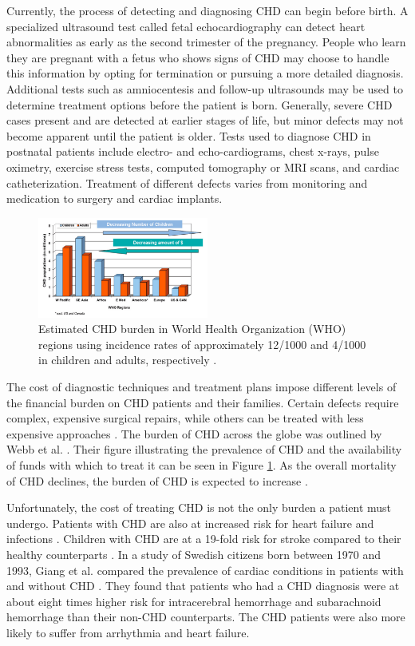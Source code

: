 Currently, the process of detecting and diagnosing CHD can begin before birth. A specialized ultrasound test called fetal echocardiography can detect heart abnormalities as early as the second trimester of the pregnancy. People who learn they are pregnant with a fetus who shows signs of CHD may choose to handle this information by opting for termination or pursuing a more detailed diagnosis. Additional tests such as amniocentesis and follow-up ultrasounds may be used to determine treatment options before the patient is born. Generally, severe CHD cases present and are detected at earlier stages of life, but minor defects may not become apparent until the patient is older. Tests used to diagnose CHD in postnatal patients include electro- and echo-cardiograms, chest x-rays, pulse oximetry, exercise stress tests, computed tomography or MRI scans, and cardiac catheterization. Treatment of different defects varies from monitoring and medication to surgery and cardiac implants.

\begin{figure}
\centering
\includegraphics[width=0.5\textwidth]{5/CHD-burden-webb.png}
\caption{Estimated CHD burden in World Health Organization (WHO) regions using incidence rates of approximately 12/1000 and 4/1000 in children and adults, respectively \cite{Webb2015}.}
\label{ch5:fig:CHD-burden}
\end{figure}

The cost of diagnostic techniques and treatment plans impose different levels of the financial burden on CHD patients and their families. Certain defects require complex, expensive surgical repairs, while others can be treated with less expensive approaches \cite{Mozaffarian2016}. The burden of CHD across the globe was outlined by Webb et al. \cite{Webb2015}. Their figure illustrating the prevalence of CHD and the availability of funds with which to treat it can be seen in Figure \ref{ch5:fig:CHD-burden}. As the overall mortality of CHD declines, the burden of CHD is expected to increase \cite{Mozaffarian2016}.

Unfortunately, the cost of treating CHD is not the only burden a patient must undergo. Patients with CHD are also at increased risk for heart failure and infections \cite{Mozaffarian2016}. Children with CHD are at a 19-fold risk for stroke compared to their healthy counterparts \cite{Fox2015}. In a study of Swedish citizens born between 1970 and 1993, Giang et al. compared the prevalence of cardiac conditions in patients with and without CHD \cite{Giang2018}. They found that patients who had a CHD diagnosis were at about eight times higher risk for intracerebral hemorrhage and subarachnoid hemorrhage than their non-CHD counterparts. The CHD patients were also more likely to suffer from arrhythmia and heart failure. 

